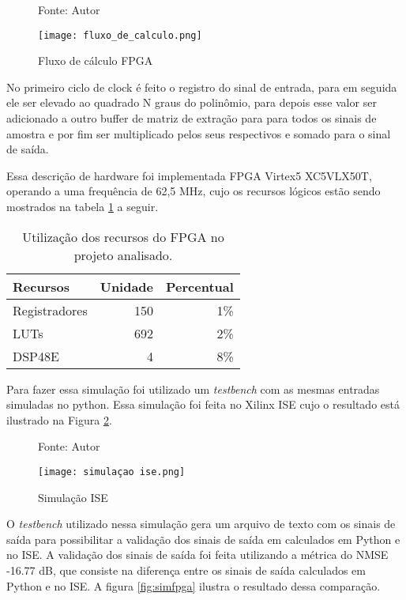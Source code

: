 \begin{figure}[htbp!]
	\centering
	\captionsetup{justification=centering}
	\caption*{Fonte: Autor}
	\texttt{[image: fluxo\_de\_calculo.png]}
	\caption{Fluxo de cálculo FPGA}
	\label{fig:fluxocal}
\end{figure}

No primeiro ciclo de clock é feito o registro do sinal de entrada, para em seguida ele ser elevado ao quadrado N graus do polinômio, para depois esse valor ser adicionado a outro buffer de matriz de extração para para todos os sinais de amostra e por fim ser multiplicado pelos seus respectivos e somado para o sinal de saída.

Essa descrição de hardware foi implementada FPGA Virtex5 XC5VLX50T, operando a uma frequência de 62,5 MHz, cujo os recursos lógicos estão sendo mostrados na tabela \ref{tab:recursos_fpga} a seguir.

\begin{table}[htbp!]
	\centering
	\begin{tabular}{|l|r|r|}
		\hline
		Recursos & Unidade & Percentual \\
		\hline
		Registradores & 150 & 1\% \\
		LUTs & 692 & 2\% \\
		DSP48E & 4 & 8\% \\
		\hline
	\end{tabular}
	\caption{Utilização dos recursos do FPGA no projeto analisado.}
	\label{tab:recursos_fpga}
\end{table}

Para fazer essa simulação foi utilizado um \textit{testbench} com as mesmas entradas simuladas no python. Essa simulação foi feita no Xilinx ISE cujo o resultado está ilustrado na Figura \ref{fig:simise}.

\begin{figure}[htbp!]
	\centering
	\captionsetup{justification=centering}
	\caption*{Fonte: Autor}
	\texttt{[image: simulaçao ise.png]}
	\caption{Simulação ISE}
	\label{fig:simise}
\end{figure}

O \textit{testbench} utilizado nessa simulação gera um arquivo de texto com os sinais de saída para possibilitar a validação dos sinais de saída em calculados em Python e no ISE. A validação dos sinais de saída foi feita utilizando a métrica do NMSE -16.77 dB, que consiste na diferença entre os sinais de saída calculados em Python e no ISE. A figura \ref{fig:simfpga} ilustra o resultado dessa comparação.



